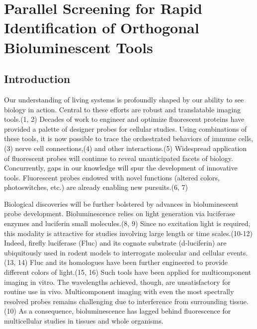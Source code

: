 
\chapter{Parallel Screening for Rapid Identification of Orthogonal Bioluminescent Tools}
\section{Introduction}
Our understanding of living systems is profoundly shaped by our ability to see biology in action. Central to these efforts are robust and translatable imaging tools.\cite{Specht:2017et,Lavis:2014jx}(1, 2) Decades of work to engineer and optimize fluorescent proteins have provided a palette of designer probes for cellular studies. Using combinations of these tools, it is now possible to trace the orchestrated behaviors of immune cells,\cite{Germain:2012ip}(3) nerve cell connections,\cite{Cai:2013dy}(4) and other interactions.\cite{Porterfield:2015bu}(5) Widespread application of fluorescent probes will continue to reveal unanticipated facets of biology. Concurrently, gaps in our knowledge will spur the development of innovative tools. Fluorescent probes endowed with novel functions (altered colors, photoswitches, etc.) are already enabling new pursuits.\cite{Rodriguez:2017ju,Betzig:2006hx}(6, 7)
\par
Biological discoveries will be further bolstered by advances in bioluminescent probe development. Bioluminescence relies on light generation via luciferase enzymes and luciferin small molecules.\cite{Prescher:2010dv,Branchini:2015epa}(8, 9) Since no excitation light is required, this modality is attractive for studies involving large length or time scales.\cite{Zhao:2005if,Rumyantsev:2016fd,Troy:2004bda}(10-12) Indeed, firefly luciferase (Fluc) and its cognate substrate (d-luciferin) are ubiquitously used in rodent models to interrogate molecular and cellular events.\cite{Adams:2014jsb,Xu:2016et}(13, 14) Fluc and its homologues have been further engineered to provide different colors of light.\cite{Branchini:2007fz,Nakatsu:2006esa}(15, 16) Such tools have been applied for multicomponent imaging in vitro. The wavelengths achieved, though, are unsatisfactory for routine use in vivo. Multicomponent imaging with even the most spectrally resolved probes remains challenging due to interference from surrounding tissue.\cite{Zhao:2005if}(10) As a consequence, bioluminescence has lagged behind fluorescence for multicellular studies in tissues and whole organisms.
